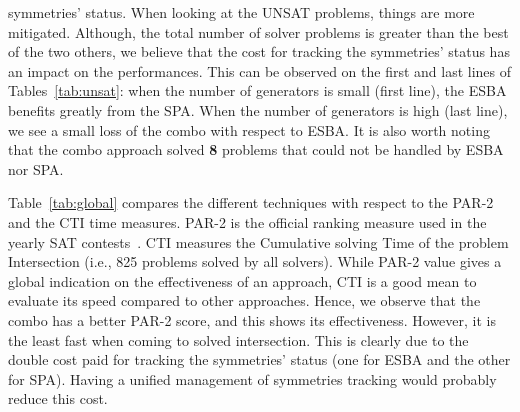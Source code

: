 symmetries' status. When looking at the UNSAT problems, things are more
mitigated. Although, the total number of solver problems is greater than the
best of the two others, we believe that the cost for tracking the symmetries'
status has an impact on the performances. This can be observed on the first and
last lines of Tables~\ref{tab:unsat}: when the number of generators is small
(first line), the ESBA benefits greatly from the SPA. When the number of
generators is high (last line), we see a small loss of the combo with respect
to ESBA. It is also worth noting that the combo approach solved \textbf{8} problems 
that could not be handled by ESBA nor SPA.
\begin{table}[!htbp]
 \begin{center}
 \end{center}
 \caption{Comparison of PAR-2 and CTI times (in seconds) of the global solving.}
 \label{tab:global}
\end{table}
Table~\ref{tab:global} compares the different techniques with respect to the
PAR-2 and the CTI time measures. PAR-2 is the official ranking measure used in
the yearly SAT contests~\cite{jarvisalo2012international}. CTI measures the
Cumulative solving Time of the problem Intersection (i.e., 825 problems solved
by all solvers). While PAR-2 value gives a global indication on the
effectiveness of an approach, CTI is a good mean to evaluate its speed compared
to other approaches.
Hence, we observe that the combo has a better PAR-2 score, and this shows its
effectiveness. However, it is the least fast when coming to solved intersection.
This is clearly due to the double cost paid for tracking the symmetries' status
(one for ESBA and the other for SPA). Having a unified management of
symmetries tracking would probably reduce this cost.
